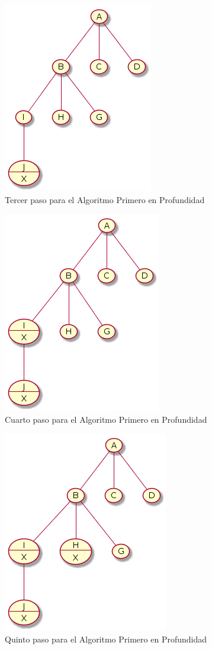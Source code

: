 \documentclass{article}
\begin{document}
\begin{figure}[H]
  \centering
  \includegraphics[width=.4\linewidth]{EJ3/profundidad_002.png}
  \caption{Tercer paso para el Algoritmo Primero en Profundidad}
  \label{gr:g4}
\end{figure}
\begin{figure}[H]
  \centering
  \includegraphics[width=.4\linewidth]{EJ3/profundidad_003.png}
  \caption{Cuarto paso para el Algoritmo Primero en Profundidad}
  \label{gr:g5}
\end{figure}
\begin{figure}[H]
  \centering
  \includegraphics[width=.4\linewidth]{EJ3/profundidad_004.png}
  \caption{Quinto paso para el Algoritmo Primero en Profundidad}
  \label{gr:g6}
\end{figure}
\end{document}
